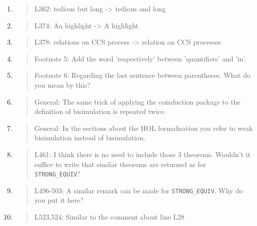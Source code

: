 \begin{enumerate}
\item \begin{quote}
    L362: tedious but long -> tedious and long
  \end{quote}

\item \begin{quote}
    L374: An highlight -> A highlight
  \end{quote}

\item \begin{quote}
    L378: relations on CCS process -> relation on CCS processes
  \end{quote}

\item \begin{quote}
    Footnote 5: Add the word 'respectively' between 'quantifiers' and 'in'.
  \end{quote}

\item \begin{quote}
    Footnote 6: Regarding the last sentence between parentheses. What do you mean by this?
  \end{quote}

\item \begin{quote}
    General: The same trick of applying the coinduction package to the
    definition of bisimulation is repeated twice.
  \end{quote}

\item \begin{quote}
    General: In the sections about the HOL formalisation you refer to
    weak bisimulation instead of bisimulation.    
  \end{quote}

\item \begin{quote}
    L461: I think there is no need to include those 3
    theorems. Wouldn’t it suffice to write that similar theorems are
    returned as for \texttt{STRONG\_EQUIV}?
  \end{quote}

\item \begin{quote}
    L496-503: A similar remark can be made for \texttt{STRONG\_EQUIV}. Why do you put it here?
  \end{quote}

\item \begin{quote}
    L523,524: Similar to the comment about line L28
  \end{quote}


\end{enumerate}
